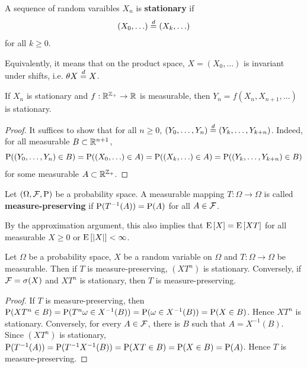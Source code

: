 \begin{definition}
    A sequence of random varaibles $X_n$ is \textbf{stationary} if 
    \begin{equation*}
        (X_0,\ldots) \deq (X_k,\ldots)
    \end{equation*}
    for all $k\geq 0$. 
\end{definition}
\begin{remark}
    Equivalently, it means that on the product space, $X = (X_0,\ldots)$ 
    is invariant under shifts, i.e. $\theta X \deq X$. 
\end{remark}

\begin{proposition}
    If $X_n$ is stationary and $f:\R^{\Z_+}\to\R$ is measurable, then 
    $Y_n = f(X_n,X_{n+1},\ldots)$ is stationary. 
\end{proposition}
\begin{proof}
    It suffices to show that for all $n\geq 0$, $(Y_0,\ldots,Y_n) \deq (Y_{k},\ldots,Y_{k+n})$. 
    Indeed, for all measurable $B\subset\R^{n+1}$, 
    \begin{equation*}
        \P((Y_0,\ldots,Y_n)\in B) = \P((X_0,\ldots)\in A) = \P((X_k,\ldots)\in A) = \P((Y_k,\ldots,Y_{k+n})\in B) 
    \end{equation*}
    for some measurable $A\subset\R^{\Z_+}$. 
\end{proof}

\begin{definition}
    Let $(\Omega,\F,\P)$ be a probability space. A measurable mapping 
    $T:\Omega\to \Omega$ is called \textbf{measure-preserving} if 
    $\P(T^{-1}(A)) = \P(A)$ for all $A\in\F$. 
\end{definition}
\begin{remark}
    By the approximation argument, this also implies that 
    $\E\sbrc{X} = \E\sbrc{XT}$ for all measurable $X\geq 0$ 
    or $\E\sbrc{\abs{X}}<\infty$.    
\end{remark}

\begin{proposition}
    Let $\Omega$ be a probability space, $X$ be a random variable on 
    $\Omega$ and $T:\Omega\to \Omega$ be measurable. Then if $T$ is 
    measure-preserving, $(XT^n)$ is stationary. Conversely, if $\F = \sigma(X)$ 
    and $XT^n$ is stationary, then $T$ is measure-preserving.
\end{proposition}
\begin{proof}
    If $T$ is measure-preserving, then $\P(XT^n\in B) = \P(T^n\omega \in X^{-1}(B)) 
    = \P(\omega\in X^{-1}(B)) = \P(X\in B)$. Hence $XT^n$ is stationary. 
    Conversely, for every $A\in\F$, there is $B$ such that $A = X^{-1}(B)$. 
    Since $(XT^n)$ is stationary, $\P(T^{-1}(A)) = \P(T^{-1}X^{-1}(B)) 
    = \P(XT\in B) = \P(X\in B) = \P(A)$. Hence $T$ is measure-preserving. 
\end{proof}

